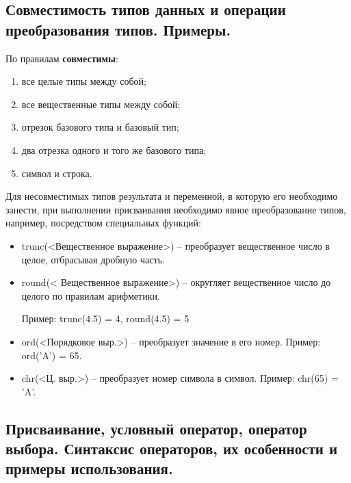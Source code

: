 
\newpage\subsection{Совместимость типов данных и операции преобразования типов. Примеры. }

\begin{myquote}
    
\end{myquote}

По правилам {\bf{совместимы}}:
\begin{enumerate}
    \item все целые типы между собой;
    \item все вещественные типы между собой;
    \item отрезок базового типа и базовый тип;
    \item два отрезка одного и того же базового типа;
    \item символ и строка.
\end{enumerate}

Для несовместимых типов результата и переменной, в которую его необходимо занести, при выполнении присваивания необходимо явное преобразование типов, например, посредством специальных функций:
\begin{itemize}
\item trunc(<Вещественное выражение>) – преобразует вещественное число в целое, отбрасывая дробную часть.

\item round(< Вещественное выражение>) – округляет вещественное число до целого по правилам арифметики.

Пример:   trunc(4.5) = 4,    round(4.5) = 5 

\item ord(<Порядковое выр.>) – преобразует значение в его номер.
Пример:   ord(’A’)  = 65.

\item chr(<Ц. выр.>) – преобразует номер символа в символ.
Пример:   chr(65) = ’A’.
\end{itemize}




\newpage\subsection{Присваивание, условный оператор, оператор выбора. Синтаксис операторов, их особенности и примеры использования. }

